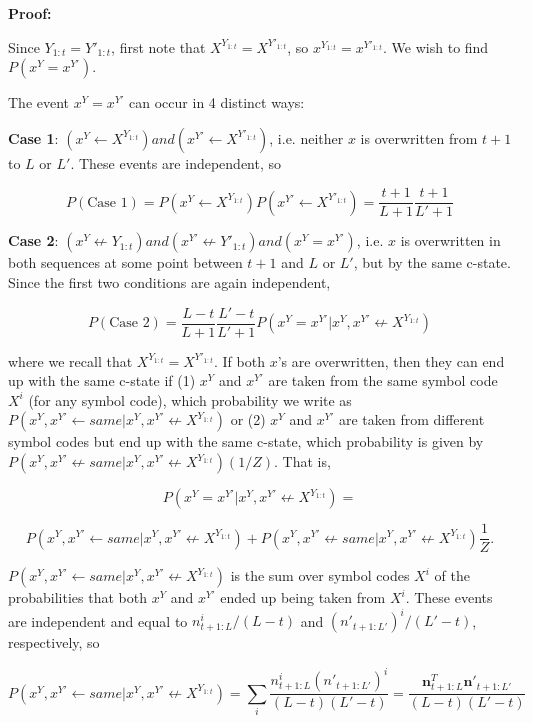 \documentclass{article}
\begin{document}
\textbf{Proof:}

Since $Y_{1:t} = Y'_{1:t}$,  first note that $X^{Y_{1:t}} = X^{Y'_{1:t}}$, so $x^{Y_{1:t}} = x^{Y'_{1:t}}$. We wish to find $P(x^Y = x^{Y'})$.

The event $x^Y = x^{Y'}$ can occur in 4 distinct ways:

\textbf{Case 1}: $(x^Y \leftarrow X^{Y_{1:t}}) and (x^{Y'} \leftarrow X^{Y'_{1:t}})$, i.e. neither $x$ is overwritten from $t+1$ to $L$ or $L'$. These events are independent, so

$$P(\textrm{Case 1}) = P(x^Y \leftarrow X^{Y_{1:t}})P(x^{Y'} \leftarrow X^{Y'_{1:t}}) = \frac{t+1}{L+1}\frac{t+1}{L'+1}$$

\textbf{Case 2}: $(x^Y \not\leftarrow Y_{1:t}) and (x^{Y'} \not\leftarrow Y'_{1:t}) and (x^Y = x^{Y'})$, i.e. $x$ is overwritten in both sequences at some point between $t+1$ and $L$ or $L'$, but by the same c-state. Since the first two conditions are again independent, 

$$P(\textrm{Case 2}) = \frac{L-t}{L+1}\frac{L'-t}{L'+1}P(x^Y = x^{Y'}|x^Y, x^{Y'} \not\leftarrow X^{Y_{1:t}})$$

where we recall that $X^{Y_{1:t}} = X^{Y'_{1:t}}$. If both $x$'s are overwritten, then they can end up with the same c-state if (1) $x^Y$ and $x^{Y'}$ are taken from the same symbol code $X^i$ (for any symbol code), which probability we write as $P(x^Y, x^{Y'} \leftarrow same|x^Y, x^{Y'} \not\leftarrow X^{Y_{1:t}})$ or (2) $x^Y$ and $x^{Y'}$ are taken from different symbol codes but end up with the same c-state, which probability is given by $P(x^Y, x^{Y'} \not\leftarrow same|x^Y, x^{Y'} \not\leftarrow X^{Y_{1:t}})(1/Z)$. That is,

$$P(x^Y = x^{Y'}|x^Y, x^{Y'} \not\leftarrow X^{Y_{1:t}}) =$$

$$P(x^Y, x^{Y'} \leftarrow same|x^Y, x^{Y'} \not\leftarrow X^{Y_{1:t}}) + P(x^Y, x^{Y'} \not\leftarrow same|x^Y, x^{Y'} \not\leftarrow X^{Y_{1:t}})\frac{1}{Z}.$$

$P(x^Y, x^{Y'} \leftarrow same|x^Y, x^{Y'} \not\leftarrow X^{Y_{1:t}})$ is the sum over symbol codes $X^i$ of the probabilities that both $x^Y$ and $x^{Y'}$ ended up being taken from $X^i$. These events are independent and equal to $n^i_{t+1:L}/(L-t)$ and $(n'_{t+1:L'})^i/(L'-t)$, respectively, so

$$P(x^Y, x^{Y'} \leftarrow same|x^Y, x^{Y'} \not\leftarrow X^{Y_{1:t}}) = \sum_i \frac{n^i_{t+1:L}(n'_{t+1:L'})^i}{(L-t)(L'-t)} = \frac{\mathbf{n}^T_{t+1:L}\mathbf{n}'_{t+1:L'}}{(L-t)(L'-t)}$$
\end{document}
